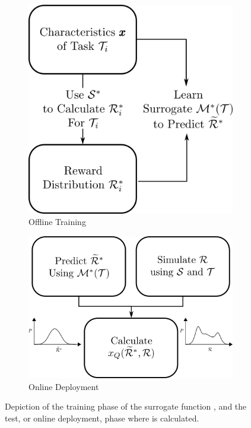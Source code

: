 \begin{figure}[tbp]
    \centering
    \begin{subfigure}[c]{0.50\linewidth}
        \centering
        \includegraphics[width=0.75\linewidth]{Figures/SQ_train.png}
        \vfill
        \caption{Offline Training}
        \label{fig:sq_train}
    \end{subfigure}%
    \hfill
    \begin{subfigure}[c]{0.50\linewidth}
        \centering
        \includegraphics[width=0.75\linewidth]{Figures/SQ_test.png}
        \caption{Online Deployment}
        \label{fig:sq_test}
    \end{subfigure} 
    \caption{Depiction of the training phase of the surrogate function \surrogate, and the test, or online deployment, phase where \xQ{} is calculated.}
    \label{fig:sq_test_train}
    \vspace{-0.5cm}
\end{figure}

